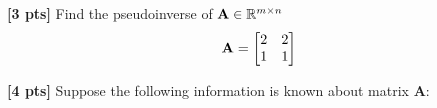 \documentclass[11pt,addpoints,answers]{exam}
\numberwithin{equation}{section} %
\numberwithin{figure}{section} %
\numberwithin{table}{section} %
\begin{document}
\begin{questions}
    \begin{tcolorbox}[fit,height=2cm, width=\textwidth, blank, borderline={0.5pt}{-2pt},halign=center, valign=center, nobeforeafter]
    \end{tcolorbox}

    \question \textbf{[3 pts]}  Find the pseudoinverse of $\mathbf{A} \in \mathbb{R}^{m \times n}$
    \begin{align*}
        \mathbf{A} = \begin{bmatrix}
            2 & 2 \\ 1 & 1
        \end{bmatrix}
    \end{align*}
    \begin{tcolorbox}[fit,height=2cm, width=\textwidth, blank, borderline={0.5pt}{-2pt},halign=center, valign=center, nobeforeafter]
    \end{tcolorbox}


    
    \question \textbf{[4 pts]} Suppose the following information is known about matrix $\mathbf{A}$:
    

\end{questions}
\end{document}
